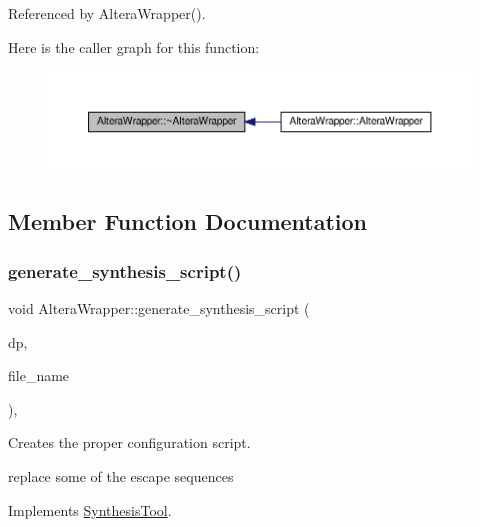Referenced by Altera\+Wrapper().

Here is the caller graph for this function\+:
\nopagebreak
\begin{figure}[H]
\begin{center}
\leavevmode
\includegraphics[width=350pt]{d3/d5f/classAlteraWrapper_afaddee368c66861d44ec787942fb49f6_icgraph}
\end{center}
\end{figure}


\subsection{Member Function Documentation}
\mbox{\label{classAlteraWrapper_adf412338b1dab2382e24b261cbe6c216}} 
\subsubsection{\texorpdfstring{generate\+\_\+synthesis\+\_\+script()}{generate\_synthesis\_script()}}
{\footnotesize\ttfamily void Altera\+Wrapper\+::generate\+\_\+synthesis\+\_\+script (\begin{DoxyParamCaption}\item[{const \hyperlink{DesignParameters_8hpp_ae36bb1c4c9150d0eeecfe1f96f42d157}{Design\+Parameters\+Ref} \&}]{dp,  }\item[{const std\+::string \&}]{file\+\_\+name }\end{DoxyParamCaption})\hspace{0.3cm}{\ttfamily [override]}, {\ttfamily [virtual]}}



Creates the proper configuration script. 

replace some of the escape sequences 

Implements \hyperlink{classSynthesisTool_ad62c7c8ec82a58b62ee6ca5325ae8e69}{Synthesis\+Tool}.



